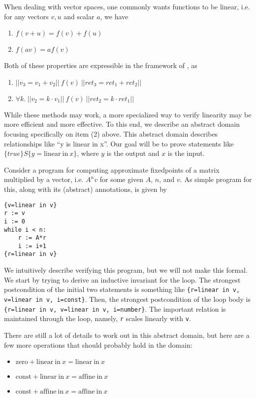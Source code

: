 \documentclass{llncs}
\newcommand{\zero}{\mathrm{zero}}
\newcommand{\const}{\mathrm{const}}
\newcommand{\afin}{\mathrm{affine\ in\ }}
\newcommand{\linin}{\mathrm{linear\ in\ }}
\begin{document}
When dealing with vector spaces, one commonly wants functions to be linear, i.e. for any vectors $v,u$ and scalar $a$, we have
\begin{enumerate}
	\item $f(v+u) = f(v) + f(u)$
    \item $f(av) = af(v)$
\end{enumerate}
Both of these properties are expressible in the framework of \cite{sousa16}, as
\begin{enumerate}
	\item $||v_3 = v_1 + v_2||\ f(v)\ ||ret_3 = ret_1+ret_2||$
    \item $\forall k.\ ||v_2 = k\cdot v_1 ||\ f(v)\ 
    	||ret_2 = k\cdot ret_1||$
\end{enumerate}

While these methods may work, a more specialized way to verify linearity may be more efficient and more effective. To this end, we describe an abstract domain focusing specifically on item (2) above. This abstract domain describes relationships like ``y is linear in x''. Our goal will be to prove statements like
$\{true\} S \{y = \mathrm{linear\ in\ }x\}$, where $y$
is the output and $x$ is the input.

Consider a program for computing approximate fixedpoints of a matrix multiplied by a vector, i.e. $A^n v$ for some given $A$, $n$, and $v$. As simple program for this, along with its (abstract) annotations, is given by

\begin{verbatim}
{v=linear in v}
r := v
i := 0
while i < n:
    r := A*r
    i := i+1
{r=linear in v}
\end{verbatim}

We intuitively describe verifying this program, but we will not make this formal. We start by trying to derive an inductive invariant for the loop. The strongest postcondition of the initial two statements is something like \texttt{\{r=linear in v, v=linear in v, i=const\}}. Then, the strongest postcondition of the loop body is \texttt{\{r=linear in v, v=linear in v, i=number\}}. The important relation is maintained through the loop, namely, \texttt{r} scales linearly with \texttt{v}.

There are still a lot of details to work out in this abstract domain, but here are a few more operations that should probably hold in the domain:
\begin{itemize}
	\item $\zero + \linin x = \linin x$
    \item $\const + \linin x = \afin x$
    \item $\const + \afin x = \afin x$
\end{itemize}
\fi
\end{document}
